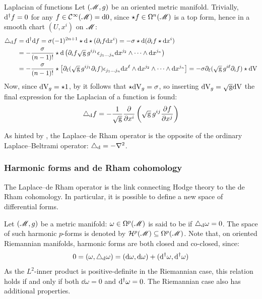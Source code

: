 \begin{example}{Laplacian of functions}{}
  Let $ (\mathscr{M},g) $ be an oriented metric manifold. Trivially, $ \mathrm{d}^\dagger f = 0 $ for any $ f \in \mathcal{C}^{\infty}(\mathscr{M}) = \mathrm{d}{0} $, since $ \star f \in \Omega^{n}(\mathscr{M}) $ is a top form, hence in a smooth chart $ (U,x^i) $ on $ \mathscr{M} $:
  \begin{equation*}
    \begin{split}
      \triangle_{\mathrm{d}} f
      & = \mathrm{d}^\dagger \mathrm{d} f = \sigma (-1)^{2n+1} \star \mathrm{d} \star (\partial_i f \mathrm{d} x^i) = - \sigma \star \mathrm{d} (\partial_i f \star \mathrm{d} x^i) \\
      & = - \frac{\sigma}{(n-1)!} \star \mathrm{d} \left( \partial_i f \sqrt{\mathrm{g}} \, g^{i j_1} \epsilon_{j_1 \dots j_n} \mathrm{d} x^{j_2} \wedge \dots \wedge \mathrm{d} x^{j_n} \right) \\
      & = - \frac{\sigma}{(n-1)!} \star \left[ \partial_\ell (\sqrt{\mathrm{g}} \, g^{ij_1} \partial_i f) \epsilon_{j_1 \dots j_n} \mathrm{d} x^\ell \wedge \mathrm{d} x^{j_2} \wedge \dots \wedge \mathrm{d} x^{j_n} \right] = - \sigma \partial_\ell (\sqrt{\mathrm{g}} \, g^{i\ell} \partial_i f) \star \mathrm{d} \mathrm{V}
    \end{split}
  \end{equation*}
  Now, since $ \mathrm{d} \mathrm{V}_g = \star 1 $, by  it follows that $ \star \mathrm{d} \mathrm{V}_g = \sigma $, so inserting $ \mathrm{d} \mathrm{V}_g = \sqrt{\mathrm{g}} \mathrm{d} \mathrm{V} $ the final expression for the Laplacian of a function is found:
  \begin{equation}
    \triangle_{\mathrm{d}} f = - \frac{1}{\sqrt{\mathrm{g}}} \frac{\partial}{\partial x^i} \left( \sqrt{\mathrm{g}} \, g^{ij} \frac{\partial f}{\partial x^j} \right)
    \label{eq:laplacian-function}
  \end{equation}
\end{example}

As hinted by , the Laplace--de Rham operator is the opposite of the ordinary Laplace--Beltrami operator: $ \triangle_{\mathrm{d}} = - \nabla^2 $.

\subsubsection{Harmonic forms and de Rham cohomology}

The Laplace--de Rham operator is the link connecting Hodge theory to the de Rham cohomology. In particular, it is possible to define a new space of differential forms.

Let $ (\mathscr{M},g) $ be a metric manifold: $ \omega \in \Omega^{p}(\mathscr{M}) $ is said to be  if $ \triangle_{\mathrm{d}} \omega = 0 $. The space of such harmonic $ p $-forms is denoted by $ \mathcal{H}^{p}(\mathscr{M}) \subseteq \Omega^{p}(\mathscr{M}) $. Note that, on oriented Riemannian manifolds, harmonic forms are both closed and co-closed, since:
\begin{equation*}
  0 = (\omega , \triangle_{\mathrm{d}} \omega) = (\mathrm{d} \omega , \mathrm{d} \omega) + (\mathrm{d}^\dagger \omega , \mathrm{d}^\dagger \omega)
\end{equation*}
As the $ L^2 $-inner product is positive-definite in the Riemannian case, this relation holds if and only if both $ \dd \omega = 0 $ and $ \mathrm{d}^\dagger \omega = 0 $. The Riemannian case also has additional properties.


